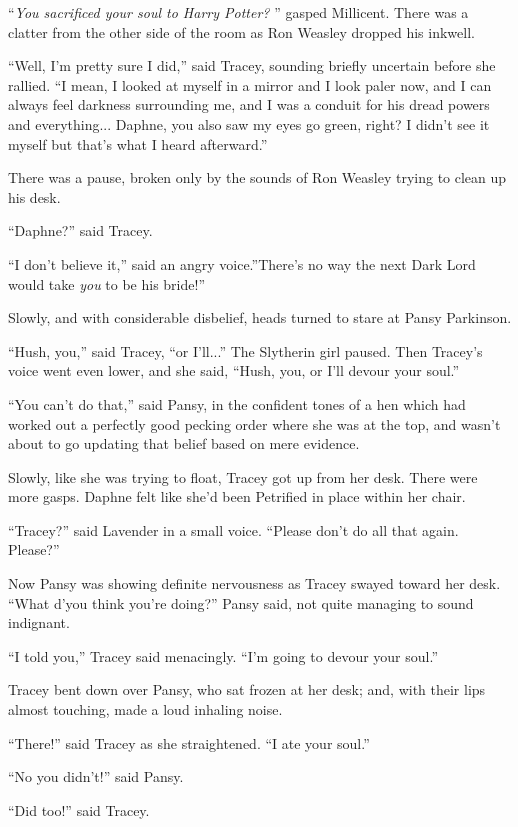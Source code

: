 ``\emph{You sacrificed your soul to Harry Potter?} '' gasped Millicent.
There was a clatter from the other side of the room as Ron Weasley
dropped his inkwell.

``Well, I'm pretty sure I did,'' said Tracey, sounding briefly uncertain
before she rallied. ``I mean, I looked at myself in a mirror and I look
paler now, and I can always feel darkness surrounding me, and I was a
conduit for his dread powers and everything... Daphne, you also saw
my eyes go green, right? I didn't see it myself but that's what I heard
afterward.''

There was a pause, broken only by the sounds of Ron Weasley trying to
clean up his desk.

``Daphne?'' said Tracey.

``I don't believe it,'' said an angry voice.''There's no way the next
Dark Lord would take \emph{you} to be his bride!''

Slowly, and with considerable disbelief, heads turned to stare at Pansy
Parkinson.

``Hush, you,'' said Tracey, ``or I'll...'' The Slytherin girl
paused. Then Tracey's voice went even lower, and she said, ``Hush, you,
or I'll devour your soul.''

``You can't do that,'' said Pansy, in the confident tones of a hen which
had worked out a perfectly good pecking order where she was at the top,
and wasn't about to go updating that belief based on mere evidence.

Slowly, like she was trying to float, Tracey got up from her desk. There
were more gasps. Daphne felt like she'd been Petrified in place within
her chair.

``Tracey?'' said Lavender in a small voice. ``Please don't do all that
again. Please?''

Now Pansy was showing definite nervousness as Tracey swayed toward her
desk. ``What d'you think you're doing?'' Pansy said, not quite managing
to sound indignant.

``I told you,'' Tracey said menacingly. ``I'm going to devour your
soul.''

Tracey bent down over Pansy, who sat frozen at her desk; and, with their
lips almost touching, made a loud inhaling noise.

``There!'' said Tracey as she straightened. ``I ate your soul.''

``No you didn't!'' said Pansy.

``Did too!'' said Tracey.

